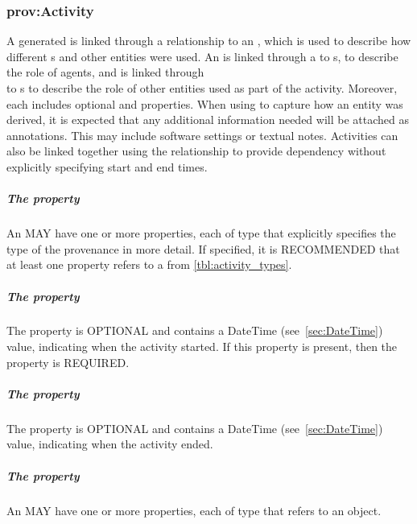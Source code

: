 \subsubsection{prov:Activity}
\label{sec:prov:Activity}

A generated  is linked through a  relationship to an , which is used to describe how different s and other entities were used. An  is linked through a  to s, to describe the role of agents, and is linked through \\  to s to describe the role of other entities used as part of the activity. Moreover, each  includes optional  and  properties. When using  to capture how an entity was derived, it is expected that any additional information needed will be attached as annotations. This may include software settings or textual notes. Activities can also be linked together using the  relationship to provide dependency without explicitly specifying start and end times.

\subparagraph{The  property}\label{sec:type:Activity}

An  MAY have one or more  properties, each of type  that explicitly specifies the type of the provenance  in more detail.  If specified, it is RECOMMENDED that at least one  property refers to a  from \ref{tbl:activity_types}.

\subparagraph{The  property}\label{sec:prov:startedAtTime}

The  property is OPTIONAL and contains a DateTime (see~\ref{sec:DateTime}) value, indicating when the activity started.  If this property is present, then the  property is REQUIRED.

\subparagraph{The  property}\label{sec:prov:endedAtTime}

The  property is OPTIONAL and contains a DateTime (see~\ref{sec:DateTime}) value, indicating when the activity ended.

\subparagraph{The  property}\label{sec:prov:qualifiedAssociation}

An  MAY have one or more  properties, each of type  that refers to an  object.

